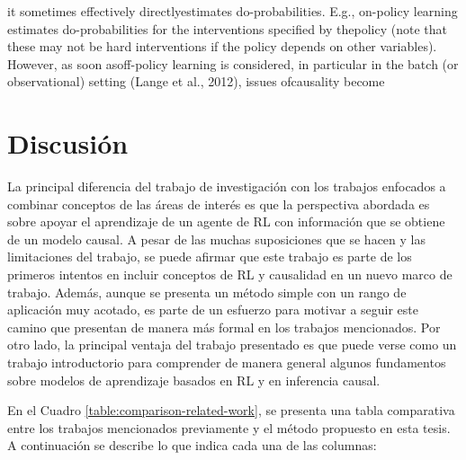 it sometimes effectively directlyestimates do-probabilities.  E.g., on-policy learning estimates do-probabilities for the interventions specified by thepolicy (note that these may not be hard interventions if the policy depends on other variables). However, as soon asoff-policy learning is considered, in particular in the batch (or observational) setting (Lange et al., 2012), issues ofcausality become

\section{Discusión}

La principal diferencia del trabajo de investigación con los trabajos enfocados a combinar conceptos de las áreas de interés es que la perspectiva abordada es sobre apoyar el aprendizaje de un agente de RL con información que se obtiene de un modelo causal. A pesar de las muchas suposiciones que se hacen y las limitaciones del trabajo, se puede afirmar que este trabajo es parte de los primeros intentos en incluir conceptos de RL y causalidad en un nuevo marco de trabajo. Además, aunque se presenta un método simple con un rango de aplicación muy acotado, es parte de un esfuerzo para motivar a seguir este camino que presentan de manera más formal en los trabajos mencionados. Por otro lado, la principal ventaja del trabajo presentado es que puede verse como un trabajo introductorio para comprender de manera general algunos fundamentos sobre modelos de aprendizaje basados en RL y en inferencia causal.

En el Cuadro \ref{table:comparison-related-work}, se presenta una tabla comparativa entre los trabajos mencionados previamente y el método propuesto en esta tesis. A continuación se describe lo que indica cada una de las columnas:

